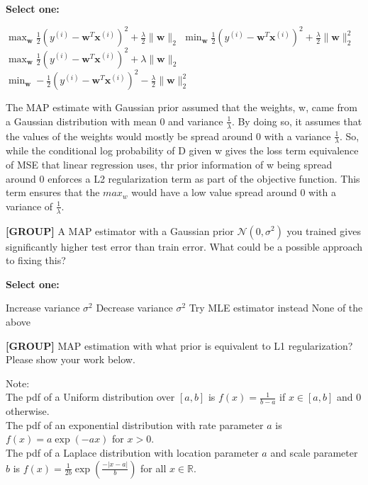 \documentclass[11pt,addpoints,answers]{exam}
\newcommand{\group}{\textbf{[GROUP]} }
\begin{document}
\begin{questions}
    \textbf{Select one:}
    \begin{checkboxes}
        \choice $\max_{\mathbf{w}} \frac{1}{2} (y^{(i)} - \mathbf{w}^T\mathbf{x}^{(i)})^2 + \frac{\lambda}{2}\|\mathbf{w}\|_2$
        \CorrectChoice $\min_{\mathbf{w}} \frac{1}{2} (y^{(i)} - \mathbf{w}^T\mathbf{x}^{(i)})^2 + \frac{\lambda}{2}\|\mathbf{w}\|_2^2$
        \choice $\max_{\mathbf{w}} \frac{1}{2} (y^{(i)} - \mathbf{w}^T\mathbf{x}^{(i)})^2 + \lambda\|\mathbf{w}\|_2$
        \choice $\min_{\mathbf{w}} - \frac{1}{2} (y^{(i)} - \mathbf{w}^T\mathbf{x}^{(i)})^2 - \frac{\lambda}{2}\|\mathbf{w}\|_2^2$
    \end{checkboxes}
    
    \begin{your_solution}[title=Your answer,height=5cm,width=15cm]
        The MAP estimate with Gaussian prior assumed that the weights, w, came from a Gaussian distribution with mean 0 and variance $\frac{1}{\lambda}$. By doing so, it assumes that the values of the weights would mostly be spread around 0 with a variance $\frac{1}{\lambda}$. So, while the conditional log probability of D given w gives the loss term equivalence of MSE that linear regression uses, thr prior information of w being spread around 0 enforces a L2 regularization term as part of the objective function. This term ensures that the $max_w$ would have a low value spread around 0 with a variance of $\frac{1}{\lambda}$.
    \end{your_solution}
    
    
    
    
    \question[2]\group A MAP estimator with a Gaussian prior $\mathcal{N}(0, \sigma^2)$ you trained gives significantly higher test error than train error. What could be a possible approach to fixing this? 

    \textbf{Select one:}
    \begin{checkboxes}
        \choice Increase variance $\sigma^2$
        \CorrectChoice Decrease variance $\sigma^2$
        \choice Try MLE estimator instead
        \choice None of the above
    \end{checkboxes}
    

    
    \question[4]\group MAP estimation with what prior is equivalent to L1 regularization?  Please show your work below.

    Note:\\
    The pdf of a Uniform distribution over $[a,b]$ is $f(x) = \frac{1}{b-a}$ if $x \in [a,b]$ and 0 otherwise.\\
    The pdf of an exponential distribution with rate parameter $a$ is $f(x) = a \exp(-a x)$ for $x > 0$.\\
    The pdf of a Laplace distribution with location parameter $a$ and scale parameter $b$  is $f(x) = \frac{1}{2b} \exp \left( \frac{- |x - a| }{b} \right)$ for all $x \in \mathbb{R}$.
    


\end{questions}
\end{document}

